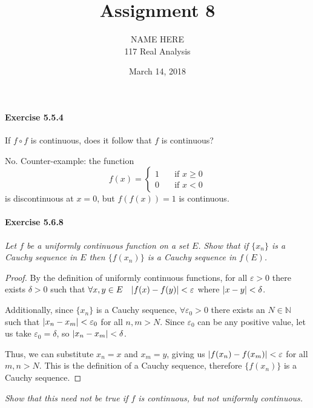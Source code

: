 \documentclass[11pt]{article}
\title{Assignment 8}
\author{NAME HERE\\117 Real Analysis}
\date{March 14, 2018}
\DeclarePairedDelimiter{\abs}{\lvert}{\rvert}
\def \N {\mathbb{N}}
\def \epsilon {\varepsilon}
\newcommand{\set}[1]{\{#1\}}
\def \xn {x_n}
\begin{document}
\maketitle

\paragraph{Exercise 5.5.4} If $f \circ f$ is continuous, does it follow that $f$ is continuous?

No. Counter-example: the function 
$$ f(x) =
	\begin{cases}
	1 & \quad \text{if } x \geq 0 \\
	0 & \quad \text{if } x < 0
	\end{cases}
$$
is discontinuous at $x = 0$, but $f(f(x)) = 1$ is continuous.

\paragraph{Exercise 5.6.8} \textit{Let $f$ be a uniformly continuous function on a set $E$. Show that if $\{x_n\}$ is a Cauchy sequence in $E$ then $\{f(x_n)\}$ is a Cauchy sequence in $f(E)$.}

\begin{proof}
	By the definition of uniformly continuous functions, for all $ \epsilon > 0 $ there exists $\delta > 0 $ such that $\forall x, y \in E \quad \abs*{f(x) - f(y)} < \epsilon $ where $ \abs*{x - y} < \delta$.
	
	Additionally, since $\set{\xn}$ is a Cauchy sequence, $\forall \epsilon_0 > 0$ there exists an $ N \in \N$ such that $ \abs{\xn - x_m} < \epsilon_0 $ for all $n, m > N$. Since $ \epsilon_0$ can be any positive value, let us take $ \epsilon_0 = \delta $, so $ \abs{\xn - x_m} < \delta $.
	
	Thus, we can substitute $\xn = x$ and $x_m = y$, giving us $\abs{f(\xn) - f(x_m)} < \epsilon$ for all $m, n > N$. This is the definition of a Cauchy sequence, therefore $\set{f(\xn)}$ is a Cauchy sequence.
\end{proof}

\def \xntozero {\lim_{\xn \to 0^+}}
\textit{Show that this need not be true if $f$ is continuous, but not uniformly continuous.}\newline
\end{document}
